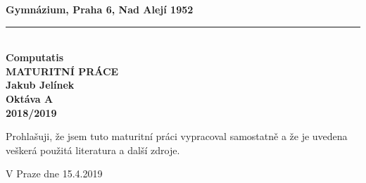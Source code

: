 \begin{titlepage}
    \begin{center}
        \textbf{\large Gymnázium, Praha 6, Nad Alejí 1952}\\
        \vspace{0.2cm}
        \rule{\textwidth}{0.5pt}\\
        \vspace{5cm}
        \textbf{\Huge Computatis}\\
        \vspace{5cm}
        \textbf{\large MATURITNÍ PRÁCE}\\
        \vspace{2cm}
        \textbf{\large Jakub Jelínek}\\
        \textbf{Oktáva A}\\
        \vspace*{\fill}
        \textbf{\large 2018/2019}\\
    \end{center}
\end{titlepage}
\newpage
Prohlašuji, že jsem tuto maturitní práci vypracoval samostatně a že je uvedena veškerá použitá literatura a další zdroje.\newline
\begin{minipage}{0.7\textwidth}
    \vspace{1cm}
    V Praze dne 15.4.2019
\end{minipage}
\begin{minipage}{0.3\textwidth}
    \vspace{1cm}
    \begin{flushright}
        \vspace{11pt}
        \hrulefill
    \end{flushright}
\end{minipage}
\newpage